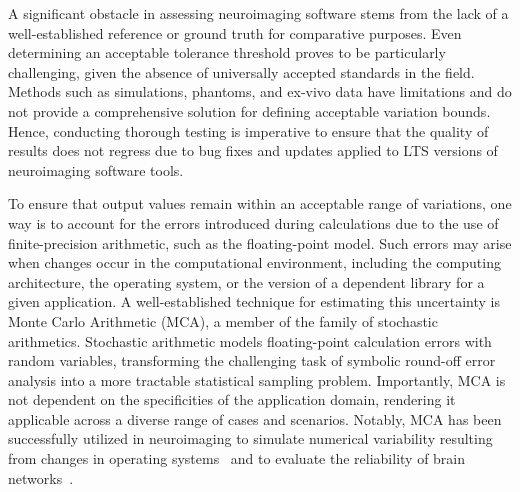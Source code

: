 \documentclass{article}
\begin{document}
A significant obstacle in assessing neuroimaging software stems from the lack of a well-established reference or ground truth for comparative purposes. Even determining an acceptable tolerance threshold proves to be particularly challenging, given the absence of universally accepted standards in the field. Methods such as simulations, phantoms, and ex-vivo data have limitations and do not provide a comprehensive solution for defining acceptable variation bounds. Hence, conducting thorough testing is imperative to ensure that the quality of results does not regress due to bug fixes and updates applied to LTS versions of neuroimaging software tools.

To ensure that output values remain within an acceptable range of variations, one way is to account for the errors introduced during calculations due to the use of finite-precision arithmetic, such as the floating-point model. Such errors may arise when changes occur in the computational environment, including the computing architecture, the operating system, or the version of a dependent library for a given application. A well-established technique for estimating this uncertainty is Monte Carlo Arithmetic (MCA), a member of the family of stochastic arithmetics. Stochastic arithmetic models floating-point calculation errors with random variables, transforming the challenging task of symbolic round-off error analysis into a more tractable statistical sampling problem. Importantly, MCA is not dependent on the specificities of the application domain, rendering it applicable across a diverse range of cases and scenarios. Notably, MCA has been successfully utilized in neuroimaging to simulate numerical variability resulting from changes in operating systems~\cite{salari2021accurate} and to evaluate the reliability of brain networks~\cite{kiar2021numerical}.


\end{document}
